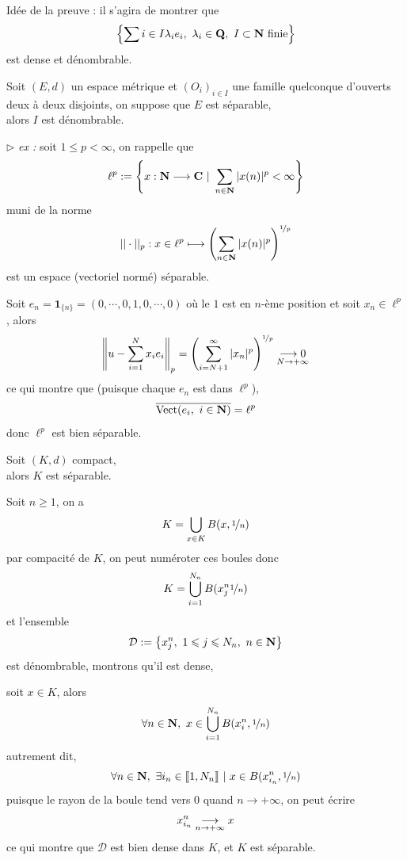 \documentclass[a4paper,11pt, twoside]{article}
\begin{document}
\begin{Proof}
  Idée de la preuve : il s'agira de montrer que 
  $$\left\{\sum{i\in I}\lambda_i e_i,\ \lambda_i\in\mathbf Q,\ I\subset\N\text{ finie}\right\}$$
  est dense et dénombrable.
\end{Proof}


\begin{prop}
  Soit $(E,d)$ un espace métrique et $(O_i)_{i\in I}$ une famille quelconque d'ouverts deux à deux disjoints, on suppose que $E$ est séparable,\\

  alors $I$ est dénombrable.
\end{prop}


$\triangleright$\emph{ ex : }soit $1\leqslant p<\infty$, on rappelle que 
$$\ell^p:=\left\{x:\N\longrightarrow\C\ |\ \sum_{n\in\N}|x(n)|^p<\infty\right\}$$
muni de la norme
$$||\cdot||_p:x\in\ell^p\longmapsto\left(\sum_{n\in\mathbf N}|x(n)|^p\right)^{\nicefrac{1}{p}}$$
est un espace (vectoriel normé) séparable.


\begin{Proof}
  Soit $e_n=\mathbf 1_{\{n\}}=(0,\cdots,0,1,0,\cdots,0)$ où le $1$ est en $n$-ème position et soit $x_n\in\ell^p$, alors 
  $$\left\lVert u-\sum_{i=1}^Nx_ie_i\right\rVert_p=\left(\sum_{i=N+1}^{\infty}|x_n|^p\right)^{\nicefrac{1}{p}}\underset{N\to+\infty}{\longrightarrow 0}$$
  ce qui montre que (puisque chaque $e_n$ est dans $\ell^p$),
  $$\overline{\mathrm{Vect}(e_i,\ i\in \mathbf N)}=\ell^p$$
  donc $\ell^p$ est bien séparable.
\end{Proof}


\begin{lemme}
  Soit $(K,d)$ compact,\\

  alors $K$ est séparable.
\end{lemme}

\begin{Proof}
  Soit $n\geqslant 1$, on a 
  $$K=\bigcup_{x\in K}B(x,\nicefrac{1}{n})$$
  par compacité de $K$, on peut numéroter ces boules donc 
  $$K=\bigcup_{i=1}^{N_n}B(x_j^n\nicefrac{1}{n})$$
  et l'ensemble 
  $$\mathcal D:=\left\{x_j^n,\ 1\leqslant j\leqslant N_n,\ n\in\N\right\}$$
  est dénombrable, montrons qu'il est dense,

  soit $x\in K$, alors 
  $$\forall n\in\N,\ x\in\bigcup_{i=1}^{N_n}B(x_i^n, \nicefrac{1}{n})$$
  autrement dit, 
  $$\forall n\in\mathbf N,\ \exists i_n\in\llbracket 1,N_n\rrbracket\ |\ x\in B(x_{i_n}^n,\nicefrac{1}{n})$$
  puisque le rayon de la boule tend vers $0$ quand $n\to+\infty$, on peut écrire 
  $$x_{i_n}^n\underset{n\to+\infty}{\longrightarrow} x$$
  ce qui montre que $\mathcal D$ est bien dense dans $K$, et $K$ est séparable.
\end{Proof}
\end{document}
